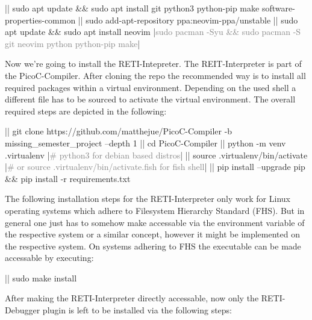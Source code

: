 \documentclass{report}
\begin{document}
\begin{terminal}
  |\prompt| sudo apt update && sudo apt install git python3 python-pip make 
     software-properties-common
  |\prompt| sudo add-apt-repository ppa:neovim-ppa/unstable
  |\prompt| sudo apt update && sudo apt install neovim
  |\textcolor{gray}{sudo pacman -Syu && sudo pacman -S git neovim python python-pip make}|
\end{terminal}

Now we're going to install the RETI-Intepreter. The REIT-Interpreter is part of the PicoC-Compiler. After cloning the repo the recommended way is to install all required packages within a \alert{virtual environment}. Depending on the used \alert{shell} a different file has to be sourced to activate the virtual environment. The overall required steps are depicted in the following:

\begin{terminal}
|\prompt| git clone https://github.com/matthejue/PicoC-Compiler
   -b missing_semester_project --depth 1
|\prompt| cd PicoC-Compiler
|\prompt| python -m venv .virtualenv |\textcolor{gray}{# python3 for debian based distros}|
|\prompt| source .virtualenv/bin/activate
|\textcolor{gray}{# or source .virtualenv/bin/activate.fish for fish shell}|
|\prompt| pip install --upgrade pip && pip install -r requirements.txt
\end{terminal}

The following installation steps for the RETI-Interpreter only work for Linux operating systems which adhere to \alert{Filesystem Hierarchy Standard} (FHS). But in general one just has to somehow make  accessable via the  environment variable of the respective system or a similar concept, however it might be implemented on the respective system. On systems adhering to FHS the executable can be made accessable by executing:

\begin{terminal}
  |\prompt| sudo make install
\end{terminal}

After making the RETI-Interpreter directly accessable, now only the RETI-Debugger plugin is left to be installed via the following steps:
\end{document}
